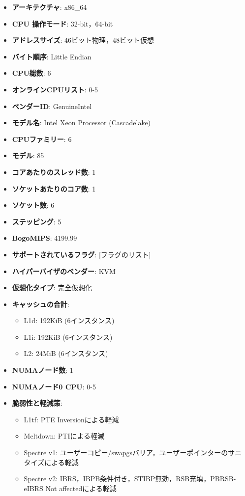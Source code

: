 \documentclass[b5paper,12pt]{jsreport}
\begin{document}
\begin{itemize}
    \item \textbf{アーキテクチャ}: x86\_64
    \item \textbf{CPU 操作モード}: 32-bit，64-bit
    \item \textbf{アドレスサイズ}: 46ビット物理，48ビット仮想
    \item \textbf{バイト順序}: Little Endian

    \item \textbf{CPU総数}: 6
    \item \textbf{オンラインCPUリスト}: 0-5
    \item \textbf{ベンダーID}: GenuineIntel
    \item \textbf{モデル名}: Intel Xeon Processor (Cascadelake)
    \item \textbf{CPUファミリー}: 6
    \item \textbf{モデル}: 85
    \item \textbf{コアあたりのスレッド数}: 1
    \item \textbf{ソケットあたりのコア数}: 1
    \item \textbf{ソケット数}: 6
    \item \textbf{ステッピング}: 5
    \item \textbf{BogoMIPS}: 4199.99
    \item \textbf{サポートされているフラグ}: [フラグのリスト]

    \item \textbf{ハイパーバイザのベンダー}: KVM
    \item \textbf{仮想化タイプ}: 完全仮想化

    \item \textbf{キャッシュの合計}:
        \begin{itemize}
            \item L1d: 192KiB (6インスタンス)
            \item L1i: 192KiB (6インスタンス)
            \item L2: 24MiB (6インスタンス)
        \end{itemize}

    \item \textbf{NUMAノード数}: 1
    \item \textbf{NUMAノード0 CPU}: 0-5

    \item \textbf{脆弱性と軽減策}:
        \begin{itemize}
            \item L1tf: PTE Inversionによる軽減
            \item Meltdown: PTIによる軽減
            \item Spectre v1: ユーザーコピー/swapgsバリア，ユーザーポインターのサニタイズによる軽減
            \item Spectre v2: IBRS，IBPB条件付き，STIBP無効，RSB充填，PBRSB-eIBRS Not affectedによる軽減
        \end{itemize}
\end{itemize}
\end{document}

